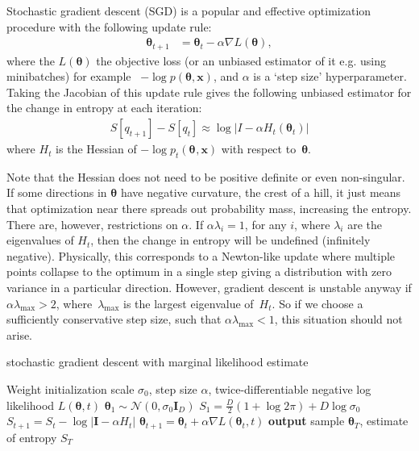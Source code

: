 \documentclass[]{article}
\newcommand{\vx}{\mathbf{x}}
\newcommand{\vr}{\mathbf{r}}
\newcommand{\vg}{\mathbf{g}}
\newcommand{\vI}{\mathbf{I}}
\newcommand{\tra}{^{\mathsf{T}}}
\newcommand{\N}[2]{\mathcal{N}\!\left(#1,#2\right)}
\newcommand{\data}{\vx}
\newcommand{\params}{\mathbf{\theta}}
\newcommand{\stepsize}{\alpha}
\newcommand{\gradparams}{\nabla L(\params_t, t)}
\newcommand{\entropy}{S}
\newcommand{\jointdist}{p(\params , \data)}
\newcommand{\subjointdist}[2]{p_{#1}(\params_{#2} , \data)}
\newcommand{\loss}{L(\params)}
\begin{document}
Stochastic gradient descent (SGD) is a popular and effective optimization procedure with the following update rule:
%
\begin{align}
\params_{t+1} &=
  \params_t - \stepsize \nabla \loss,
\end{align}
%
where the $\loss$ the objective loss (or an unbiased estimator of it e.g. using minibatches)
for example ~$-\log\jointdist$, and $\stepsize$ is a `step size' hyperparameter.
Taking the Jacobian of this update rule gives the following unbiased estimator
for the change in entropy at each iteration:
%
\begin{align}
S[q_{t+1}] - S[q_t] \approx \log \left| I - \stepsize H_t(\params_t)
\right| \label{eq:exact hessian}
\end{align}
%
where $H_t$ is the Hessian of $-\log\subjointdist{t}{}$ with respect to~$\params$.

Note that the Hessian does not need to be positive definite or even non-singular.
If some directions in $\params$ have negative curvature, the crest of a hill, it just means that optimization near there spreads out probability mass, increasing the entropy.
There are, however, restrictions on $\stepsize$.
If ${\stepsize\lambda_i = 1}$, for any $i$, where $\lambda_i$ are the eigenvalues of $H_t$, then the change in entropy will be undefined (infinitely negative).
Physically, this corresponds to a Newton-like update where multiple points collapse to the optimum in a single step giving a distribution with zero variance in a particular direction.
However, gradient descent is unstable anyway if ${\stepsize\lambda_{\text{max}} > 2}$, where~$\lambda_{\text{max}}$ is the largest eigenvalue of~$H_t$.
So if we choose a sufficiently conservative step size, such that $\stepsize\lambda_{\text{max}} < 1$,
this situation should not arise.

\begin{algorithm}[t]
   \caption{stochastic gradient descent with marginal likelihood estimate}
   \label{alg:sgd-with-estimate}
\begin{algorithmic}[1]
	Weight initialization scale $\sigma_0$, step size $\stepsize$, 	
	twice-differentiable negative log likelihood $L(\params, t)$	
	 $\params_1 \sim \N{0}{\sigma_0 \vI_D}$
	 $\entropy_{1} = \frac{D}{2} (1 + \log 2 \pi) + D \log\sigma_0$
		\State $\entropy_{t+1} = \entropy_t - \log \left| \vI - \stepsize H_t \right|$   \label{step:entropy-update}
		\State $\params_{t+1} = \params_t + \stepsize \gradparams$  		
   \EndFor
   \State \textbf{output} sample $\params_T$, estimate of entropy $\entropy_T$
\end{algorithmic}
\end{algorithm}
%
\end{document}
